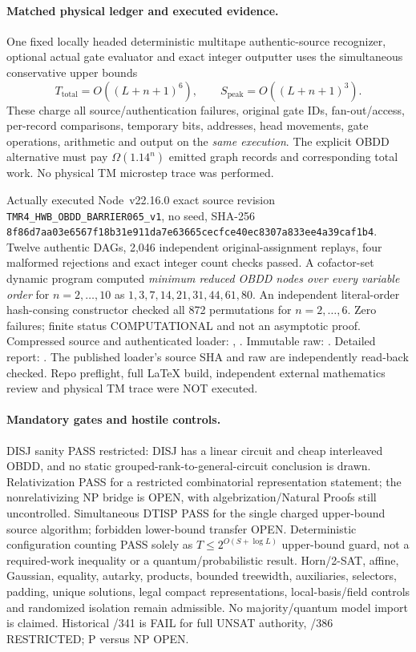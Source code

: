 \documentclass[11pt]{article}
\begin{document}
\paragraph{Matched physical ledger and executed evidence.}
One fixed locally headed deterministic multitape authentic-source
recognizer, optional actual gate evaluator and exact integer outputter
uses the simultaneous conservative upper bounds
\[
T_{\mathrm{total}}=O((L+n+1)^6),\qquad
S_{\mathrm{peak}}=O((L+n+1)^3).
\]
These charge all source/authentication failures, original gate IDs,
fan-out/access, per-record comparisons, temporary bits, addresses,
head movements, gate operations, arithmetic and output on the
\emph{same execution}. The explicit OBDD alternative must pay
$\Omega(1.14^n)$ emitted graph records and corresponding total work.
No physical TM microstep trace was performed.

Actually executed Node~v22.16.0 exact source revision
\texttt{TMR4\_HWB\_OBDD\_BARRIER065\_v1}, no seed, SHA-256
\texttt{8f86d7aa03e6567f18b31e911da7e63665cecfce40ec8307a833ee4a39caf1b4}.
Twelve authentic DAGs, 2,046 independent original-assignment replays,
four malformed rejections and exact integer count checks passed.
A cofactor-set dynamic program computed \emph{minimum reduced OBDD nodes
over every variable order} for $n=2,\ldots,10$ as
$1,3,7,14,21,31,44,61,80$. An independent literal-order
hash-consing constructor checked all 872 permutations for $n=2,\ldots,6$.
Zero failures; finite status COMPUTATIONAL and not an asymptotic proof.
Compressed source and authenticated loader:
,
.
Immutable raw:
.
Detailed report:
.
The published loader's source SHA and raw are independently read-back
checked. Repo preflight, full LaTeX build, independent external mathematics
review and physical TM trace were NOT executed.

\paragraph{Mandatory gates and hostile controls.}
DISJ sanity PASS restricted: DISJ has a linear circuit and cheap
interleaved OBDD, and no static grouped-rank-to-general-circuit
conclusion is drawn. Relativization PASS for a restricted combinatorial
representation statement; the nonrelativizing NP bridge is OPEN, with
algebrization/Natural Proofs still uncontrolled. Simultaneous DTISP
PASS for the single charged upper-bound source algorithm; forbidden
lower-bound transfer OPEN. Deterministic configuration counting PASS
solely as $T\le2^{O(S+\log L)}$ upper-bound guard, not a required-work
inequality or a quantum/probabilistic result. Horn/2-SAT, affine,
Gaussian, equality, autarky, products, bounded treewidth, auxiliaries,
selectors, padding, unique solutions, legal compact representations,
local-basis/field controls and randomized isolation remain admissible.
No majority/quantum model import is claimed. Historical /341 is FAIL
for full UNSAT authority, /386 RESTRICTED; P versus NP OPEN.
\end{document}
